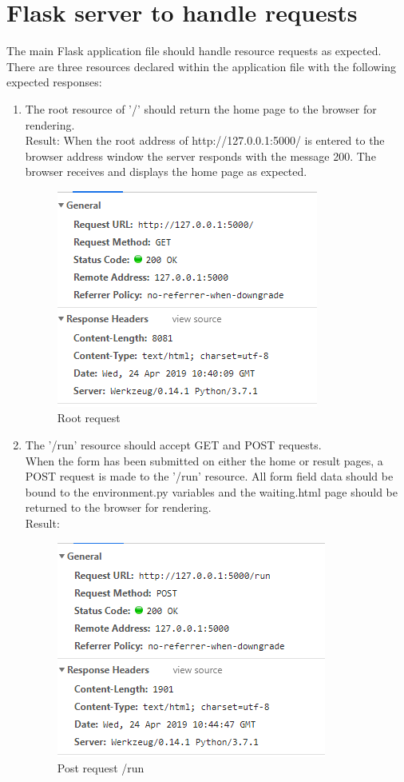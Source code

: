 \section{Flask server to handle requests}
The main Flask application file should handle resource requests as expected.\\
There are three resources declared within the application file with the following expected responses:
\begin{enumerate}
	\item The root resource of '/' should return the home page to the browser for rendering.\\
	 Result: When the root address of http://127.0.0.1:5000/ is entered to the browser address window the server responds with the message 200. The browser receives and displays the home page as expected.
	\begin{figure}[H]
		\centering
		\includegraphics[width=0.7\linewidth]{img/RootReq}
		\caption{Root request}
		\label{fig:rootreq}
	\end{figure}
	
	\item The '/run' resource should accept GET and POST requests.\\
	When the form has been submitted on either the home or result pages, a POST request is made to the '/run' resource. All form field data should be bound to the environment.py variables and the waiting.html page should be returned to the browser for rendering.\\
	Result:
	\begin{figure}[H]
		\centering
		\includegraphics[width=0.7\linewidth]{img/RunResource}
		\caption{Post request /run}
		\label{fig:runresource}
	\end{figure}
	

\end{enumerate}
